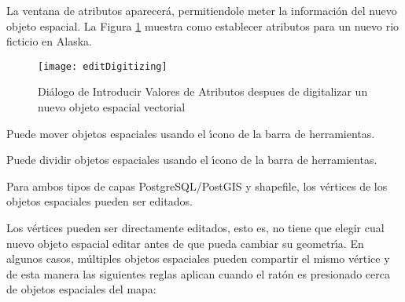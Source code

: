 La ventana de atributos aparecer\'a, permitiendole meter la informaci\'on del nuevo objeto espacial.
La Figura \ref{fig:vector_digitising} muestra como establecer atributos para un nuevo rio ficticio
en Alaska.

\begin{figure}[ht]
   \begin{center}
   \caption{Di\'alogo de Introducir Valores de Atributos despues de digitalizar un nuevo objeto espacial vectorial
   \nixcaption}\label{fig:vector_digitising}\smallskip
   \texttt{[image: editDigitizing]}
\end{center}  
\end{figure}

\begin{Tip}[ht]\caption{\textsc{Tipos de Valores de Atributos}}
\end{Tip}


Puede mover objetos espaciales usando el \'{\i}cono  
de la barra de herramientas.


Puede dividir objetos espaciales usando el \'{\i}cono 
de la barra de herramientas.


Para ambos tipos de capas PostgreSQL/PostGIS y  shapefile, los v\'ertices de los objetos espaciales pueden ser editados. 

Los v\'ertices pueden ser directamente editados, esto es, no tiene
que elegir cual nuevo objeto espacial editar antes de que pueda cambiar
su geometr\'{\i}a.
En algunos casos, m\'ultiples objetos espaciales pueden compartir el mismo v\'ertice
y de esta manera las siguientes reglas aplican cuando el rat\'on es presionado
cerca de objetos espaciales del mapa:

